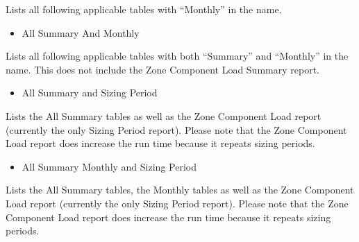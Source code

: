 Lists all following applicable tables with ``Monthly'' in the name.

\begin{itemize}
\tightlist
\item
  All Summary And Monthly
\end{itemize}

Lists all following applicable tables with both ``Summary'' and ``Monthly'' in the name. This does not include the Zone Component Load Summary report.

\begin{itemize}
\tightlist
\item
  All Summary and Sizing Period
\end{itemize}

Lists the All Summary tables as well as the Zone Component Load report (currently the only Sizing Period report). Please note that the Zone Component Load report does increase the run time because it repeats sizing periods.

\begin{itemize}
\tightlist
\item
  All Summary Monthly and Sizing Period
\end{itemize}

Lists the All Summary tables, the Monthly tables as well as the Zone Component Load report (currently the only Sizing Period report). Please note that the Zone Component Load report does increase the run time because it repeats sizing periods.

